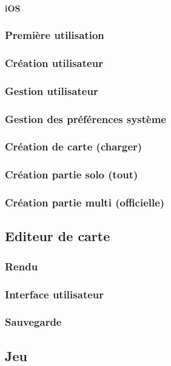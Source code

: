 			
		\paragraph{iOS}
				
	\subsubsection{Première utilisation}
	\subsubsection{Création utilisateur}
	\subsubsection{Gestion utilisateur}
	\subsubsection{Gestion des préférences système}
	\subsubsection{Création de carte (charger)}
	\subsubsection{Création partie solo (tout)}
	\subsubsection{Création partie multi (officielle)}
			

\subsection{Editeur de carte}
	\subsubsection{Rendu}
		\subsubsection{Interface utilisateur}
		\subsubsection{Sauvegarde}


\subsection{Jeu}
